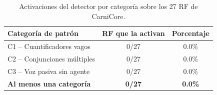 \begin{table}[t]
\centering
\caption{Activaciones del detector por categoría sobre los 27 RF de CarniCore.}
\label{tab:detector}
\begin{tabular}{lcc}
\hline
\textbf{Categoría de patrón} & \textbf{RF que la activan} & \textbf{Porcentaje} \\
\hline
C1 -- Cuantificadores vagos & 0/27 & 0.0\% \\
C2 -- Conjunciones múltiples & 0/27 & 0.0\% \\
C3 -- Voz pasiva sin agente & 0/27 & 0.0\% \\
\hline
\textbf{Al menos una categoría} & \textbf{0/27} & \textbf{0.0\%} \\
\hline
\end{tabular}
\end{table}
